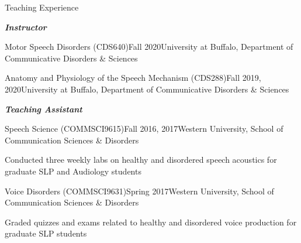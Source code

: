 \documentclass{resume} %
\begin{document}




\begin{rSection}{Teaching Experience}

\begin{center}
	{\bf \emph{Instructor}}
\end{center}

	\begin{rSubsection}{Motor Speech Disorders (CDS640)}{Fall 2020}{University at Buffalo, Department of Communicative Disorders \& Sciences}{}
	\end{rSubsection}
	
	\begin{rSubsection}{Anatomy and Physiology of the Speech Mechanism (CDS288)}{Fall 2019, 2020}{University at Buffalo, Department of Communicative Disorders \& Sciences}{}
	\end{rSubsection}

\begin{center}
	{\bf \emph{Teaching Assistant}}
\end{center}
	
	\begin{rSubsection}{Speech Science (COMMSCI9615)}{Fall 2016, 2017}{Western University, School of Communication Sciences \& Disorders}{}
	\item Conducted three weekly labs on healthy and disordered speech acoustics for graduate SLP and Audiology students
	\end{rSubsection}

	\begin{rSubsection}{Voice Disorders (COMMSCI9631)}{Spring 2017}{Western University, School of Communication Sciences \& Disorders}{}
	\item Graded quizzes and exams related to healthy and disordered voice production for graduate SLP students
	\end{rSubsection}
	

\end{rSection}
\end{document}

